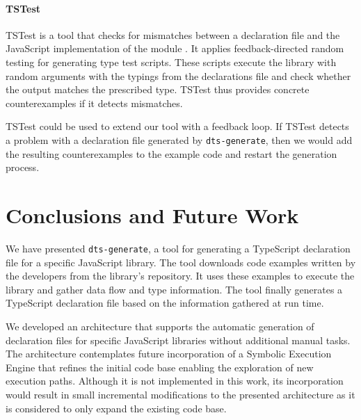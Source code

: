 \documentclass[english,cleveref,autoref,submission]{programming}
\begin{document}
\paragraph*{TSTest}
TSTest is a tool that checks for mismatches between a declaration file and the JavaScript
implementation of the module \cite{DBLP:journals/pacmpl/KristensenM17}. It applies feedback-directed
random testing for generating type test scripts. These scripts execute the library with
random arguments with the typings from the declarations file and check whether the output
matches the prescribed type. TSTest thus provides concrete counterexamples if it detects mismatches.



TSTest could be used to extend our tool with a feedback loop. If TSTest detects a problem
with a declaration file generated by \texttt{dts-generate}, then we would add the
resulting counterexamples to the example code and restart the generation process. 

\section{Conclusions and Future Work}
\label{sec:conclusion}
We have presented \texttt{dts-generate}, a tool for generating a TypeScript declaration
file for a specific JavaScript library. The tool downloads code examples written by the
developers from the library's repository. It uses these examples to execute the library and
gather data flow and type information. The tool finally generates a TypeScript declaration
file based on the information gathered at run time.

We developed an architecture that supports the automatic generation of declaration files
for specific JavaScript libraries without additional manual tasks. The architecture
contemplates future incorporation of a Symbolic Execution Engine that refines the
initial code base enabling the exploration of new execution paths. Although it is not
implemented 
in this work, its incorporation would result in small incremental modifications to the
presented architecture as it is considered to only expand the existing code base.
\end{document}
